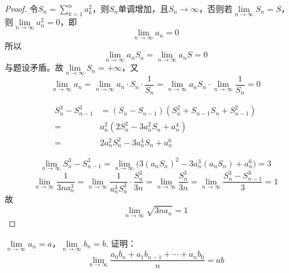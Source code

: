 \begin{proof}

    令$S_n = \sum\limits_{k  = 1}^{n}{a_k^2}$，则$S_n$单调增加，且$S_n \to \infty$，否则若$\lim\limits_{n \to \infty}{S_n} = S$，\\
    则$\lim\limits_{n \to \infty}{a_n^2} = 0$，即
    \[\lim\limits_{n \to \infty}{a_n} = 0\]
    所以
    \[\lim\limits_{n \to \infty}{a_nS_n} = \lim\limits_{n \to \infty}{a_nS} = 0\]
    与题设矛盾。故$\lim\limits_{n \to \infty}{S_n} = +\infty$，又
    \[\lim\limits_{n \to \infty}{a_n} = \lim\limits_{n \to \infty}{a_n \cdot S_n \cdot \dfrac{1}{S_n}} = \lim\limits_{n \to \infty}{a_nS_n} \cdot \lim\limits_{n \to \infty}{\dfrac{1}{S_n}} = 0\]

    \begin{align*}
        S_n^3 - S_{n - 1}^3 & = (S_n - S_{n - 1}) (S_n^2 + S_{n - 1}S_n + S_{n - 1}^2) \\
        = & a_n^2 (2S_n^2 - 3a_n^2S_n + a_n^4) \\
        = & 2a_n^2S_n^2 - 3a_n^4S_n + a_n^6 
    \end{align*}
    
    \[\lim\limits_{n \to \infty}{S_n^3 - S_{n - 1}^3} =  \lim\limits_{n \to \infty}{\big( 3(a_nS_n)^2 - 3a_n^3(a_nS_n) + a_n^6 \big)} = 3\]
    \[\lim\limits_{n \to \infty}{\dfrac{1}{3na_n^3}} = \lim\limits_{n \to \infty}{\dfrac{1}{a_n^3S_n^3} \cdot \dfrac{S_n^3}{3n}} = \lim\limits_{n \to \infty}{\dfrac{S_n^3}{3n}} = \lim\limits_{n \to \infty}{\dfrac{S_n^3 - S_{n - 1}^3}{3}} = 1\]
    故
    \[\lim\limits_{n \to \infty}{\sqrt{3na_n}} = 1\]

\end{proof}

\begin{proposition}

    $\lim\limits_{n \to \infty}{a_n} = a $，$\lim\limits_{n \to \infty}{b_n} = b $. 证明：
    \[\lim\limits_{n \to \infty}{\dfrac{a_0b_n + a_1b_{n - 1} + \cdots + a_nb_0}{n}} = ab\]

\end{proposition}

